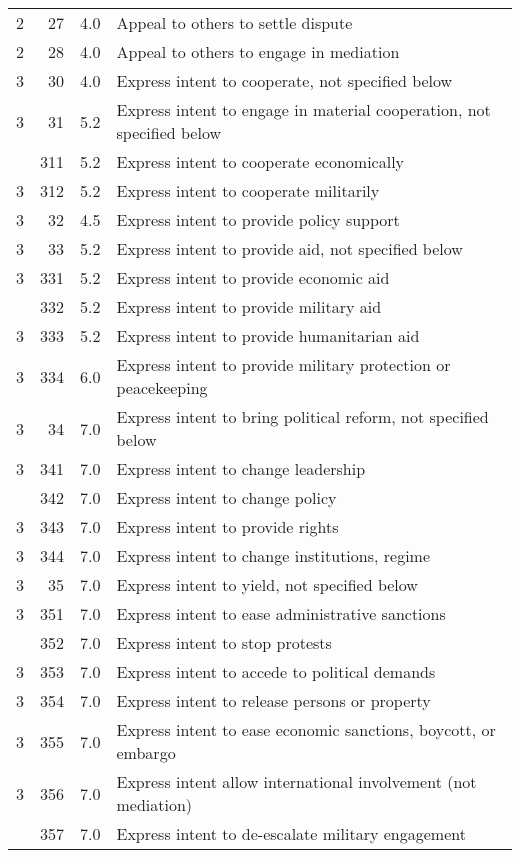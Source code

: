 \documentclass[10pt,]{article}
\begin{document}
\begin{longtable}[t]{rrrl}
2 & 27 & 4.0 & Appeal to others to settle dispute\\
2 & 28 & 4.0 & Appeal to others to engage in mediation\\
3 & 30 & 4.0 & Express intent to cooperate, not specified below\\
3 & 31 & 5.2 & Express intent to engage in material cooperation,  not specified below\\
\addlinespace
3 & 311 & 5.2 & Express intent to cooperate economically\\
3 & 312 & 5.2 & Express intent to cooperate militarily\\
3 & 32 & 4.5 & Express intent to provide policy support\\
3 & 33 & 5.2 & Express intent to provide aid, not specified below\\
3 & 331 & 5.2 & Express intent to provide economic aid\\
\addlinespace
3 & 332 & 5.2 & Express intent to provide military aid\\
3 & 333 & 5.2 & Express intent to provide humanitarian aid\\
3 & 334 & 6.0 & Express intent to provide military protection or peacekeeping\\
3 & 34 & 7.0 & Express intent to bring political reform, not specified below\\
3 & 341 & 7.0 & Express intent to change leadership\\
\addlinespace
3 & 342 & 7.0 & Express intent to change policy\\
3 & 343 & 7.0 & Express intent to provide rights\\
3 & 344 & 7.0 & Express intent to change institutions, regime\\
3 & 35 & 7.0 & Express intent to yield, not specified below\\
3 & 351 & 7.0 & Express intent to ease administrative sanctions\\
\addlinespace
3 & 352 & 7.0 & Express intent to stop protests\\
3 & 353 & 7.0 & Express intent to accede to political demands\\
3 & 354 & 7.0 & Express intent to release persons or property\\
3 & 355 & 7.0 & Express intent to ease economic sanctions, boycott, or embargo\\
3 & 356 & 7.0 & Express intent allow international involvement (not mediation)\\
\addlinespace
3 & 357 & 7.0 & Express intent to de-escalate military engagement\\

\end{longtable}
\end{document}
